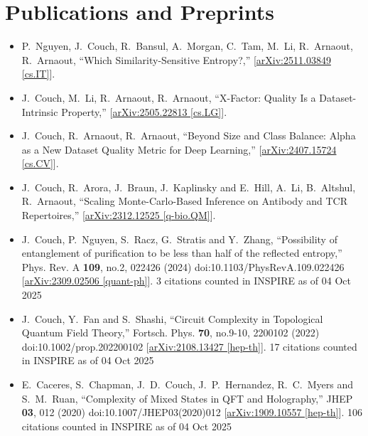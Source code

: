 \section*{Publications and Preprints}
\begin{itemize}

\item
    P.~Nguyen, J.~Couch, R.~Bansul, A.~Morgan, C.~Tam, M.~Li, R.~Arnaout, R.~Arnaout,
    ``Which Similarity-Sensitive Entropy?,''
    [\href{https://arxiv.org/abs/2511.03849}{arXiv:2511.03849 [cs.IT]}].

\item
    J.~Couch, M.~Li, R.~Arnaout, R.~Arnaout,
    ``X-Factor: Quality Is a Dataset-Intrinsic Property,''
    [\href{https://arxiv.org/abs/2505.22813}{arXiv:2505.22813 [cs.LG]}].


\item
    J.~Couch, R.~Arnaout, R.~Arnaout,
    ``Beyond Size and Class Balance: Alpha as a New Dataset Quality Metric for Deep Learning,''
    [\href{https://arxiv.org/abs/2407.15724}{arXiv:2407.15724 [cs.CV]}].
    

\item
    J.~Couch, R.~Arora, J.~Braun, J.~Kaplinsky and E.~Hill, A.~Li, B.~Altshul, R.~Arnaout,
    ``Scaling Monte-Carlo-Based Inference on Antibody and TCR Repertoires,''
    [\href{https://arxiv.org/abs/2312.12525}{arXiv:2312.12525 [q-bio.QM]}].


\item 
    J.~Couch, P.~Nguyen, S.~Racz, G.~Stratis and Y.~Zhang,
    ``Possibility of entanglement of purification to be less than half of the reflected entropy,''
    Phys. Rev. A \textbf{109}, no.2, 022426 (2024)
    doi:10.1103/PhysRevA.109.022426
    [\href{https://arxiv.org/abs/2309.02506}{arXiv:2309.02506 [quant-ph]}].
    3 citations counted in INSPIRE as of 04 Oct 2025

\item
    J.~Couch, Y.~Fan and S.~Shashi,
    ``Circuit Complexity in Topological Quantum Field Theory,''
    Fortsch. Phys. \textbf{70}, no.9-10, 2200102 (2022)
    doi:10.1002/prop.202200102
    [\href{https://arxiv.org/abs/2108.13427}{arXiv:2108.13427 [hep-th]}].
    17 citations counted in INSPIRE as of 04 Oct 2025
  
\item
    E.~Caceres, S.~Chapman, J.~D.~Couch, J.~P.~Hernandez, R.~C.~Myers and S.~M.~Ruan,
    ``Complexity of Mixed States in QFT and Holography,''
    JHEP \textbf{03}, 012 (2020)
    doi:10.1007/JHEP03(2020)012
    [\href{https://arxiv.org/abs/1909.10557}{arXiv:1909.10557 [hep-th]}].
    106 citations counted in INSPIRE as of 04 Oct 2025


\end{itemize}
